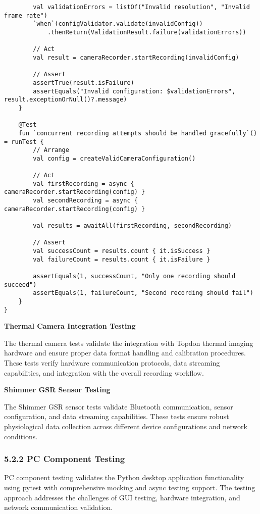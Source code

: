 \documentclass[12pt,a4paper]{article}
\begin{document}
\begin{verbatim}
        val validationErrors = listOf("Invalid resolution", "Invalid frame rate")
        `when`(configValidator.validate(invalidConfig))
            .thenReturn(ValidationResult.failure(validationErrors))
        
        // Act
        val result = cameraRecorder.startRecording(invalidConfig)
        
        // Assert
        assertTrue(result.isFailure)
        assertEquals("Invalid configuration: $validationErrors", result.exceptionOrNull()?.message)
    }
    
    @Test
    fun `concurrent recording attempts should be handled gracefully`() = runTest {
        // Arrange
        val config = createValidCameraConfiguration()
        
        // Act
        val firstRecording = async { cameraRecorder.startRecording(config) }
        val secondRecording = async { cameraRecorder.startRecording(config) }
        
        val results = awaitAll(firstRecording, secondRecording)
        
        // Assert
        val successCount = results.count { it.isSuccess }
        val failureCount = results.count { it.isFailure }
        
        assertEquals(1, successCount, "Only one recording should succeed")
        assertEquals(1, failureCount, "Second recording should fail")
    }
}
\end{verbatim}

\textbf{Thermal Camera Integration Testing}

The thermal camera tests validate the integration with Topdon thermal imaging hardware and ensure proper data format
handling and calibration procedures. These tests verify hardware communication protocols, data streaming capabilities,
and integration with the overall recording workflow.

\textbf{Shimmer GSR Sensor Testing}

The Shimmer GSR sensor tests validate Bluetooth communication, sensor configuration, and data streaming capabilities.
These tests ensure robust physiological data collection across different device configurations and network conditions.

\subsubsection{5.2.2 PC Component Testing}

PC component testing validates the Python desktop application functionality using pytest with comprehensive mocking and
async testing support. The testing approach addresses the challenges of GUI testing, hardware integration, and network
communication validation.
\end{document}
